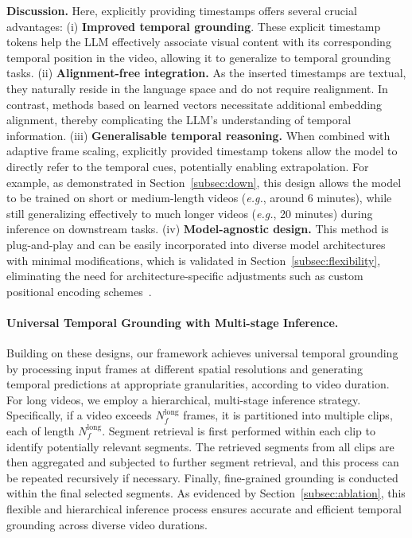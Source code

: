 \noindent \textbf{Discussion.} 
Here, explicitly providing timestamps offers several crucial advantages: 
(i) \textbf{Improved temporal grounding}. These explicit timestamp tokens help the LLM effectively associate visual content with its corresponding temporal position in the video, allowing it to generalize to temporal grounding tasks.
(ii) \textbf{Alignment-free integration.} As the inserted timestamps are textual, they naturally reside in the language space and do not require realignment. In contrast, methods based on learned vectors necessitate additional embedding alignment, thereby complicating the LLM’s understanding of temporal information.
(iii) \textbf{Generalisable temporal reasoning.} When combined with adaptive frame scaling, explicitly provided timestamp tokens allow the model to directly refer to the temporal cues, potentially enabling extrapolation. For example, as demonstrated in Section~\ref{subsec:down}, this design allows the model to be trained on short or medium-length videos ({\em e.g.}, around 6 minutes), while still generalizing effectively to much longer videos ({\em e.g.}, 20 minutes) during inference on downstream tasks.
(iv) \textbf{Model-agnostic design.} This method is plug-and-play and can be easily incorporated into diverse model architectures with minimal modifications, which is validated in Section~\ref{subsec:flexibility}, eliminating the need for architecture-specific adjustments such as custom positional encoding schemes~\cite{guo2025vtg,bai2025qwen2}. 

\paragraph{Universal Temporal Grounding with Multi-stage Inference.}
Building on these designs, our framework achieves universal temporal grounding by processing input frames at different spatial resolutions and generating temporal predictions at appropriate granularities, according to video duration. 
For long videos, we employ a hierarchical, multi-stage inference strategy. Specifically, if a video exceeds $N_f^{\text{long}}$ frames, it is partitioned into multiple clips, each of length $N_f^{\text{long}}$. Segment retrieval is first performed within each clip to identify potentially relevant segments. The retrieved segments from all clips are then aggregated and subjected to further segment retrieval, and this process can be repeated recursively if necessary.
Finally, fine-grained grounding is conducted within the final selected segments.
As evidenced by Section~\ref{subsec:ablation}, this flexible and hierarchical inference process ensures accurate and efficient temporal grounding across diverse video durations.


